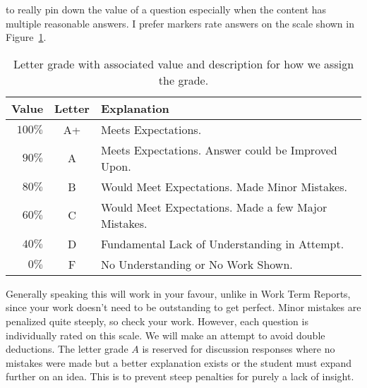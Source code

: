 to really pin down the value of a question especially when the content has
multiple reasonable answers. I prefer markers
rate answers on the scale shown in Figure~\ref{tab:letter-grading}.
\begin{table}
\centering
\begin{tabular}{r|c|l}
Value & Letter & Explanation\\ \hline
\(100\%\) & A+ & Meets Expectations.\\ \hline
\(90\%\)  & A & Meets Expectations. Answer could be Improved Upon. \\ \hline
\(80\%\) & B & Would Meet Expectations. Made Minor Mistakes.\\ \hline
\(60\%\) & C & Would Meet Expectations. Made a few Major Mistakes.\\ \hline
\(40\%\) & D & Fundamental Lack of Understanding in Attempt.\\ \hline
\(0\%\) & F & No Understanding or No Work Shown.
\end{tabular}
\caption[Letter Grading Scheme]{Letter grade with associated value and
description for how we assign the grade.}
\label{tab:letter-grading}
\end{table}
Generally speaking this will work in your favour, unlike in Work Term Reports,
since your work doesn't need to be outstanding to get perfect. Minor mistakes
are penalized quite steeply, so check your work. However, each question is
individually rated on this scale. We will make an attempt to avoid double
deductions. The letter grade \(A\) is reserved for discussion responses where
no mistakes were made but a better explanation exists or the student must
expand further on an idea. This is to prevent steep penalties for purely a lack
of insight.
